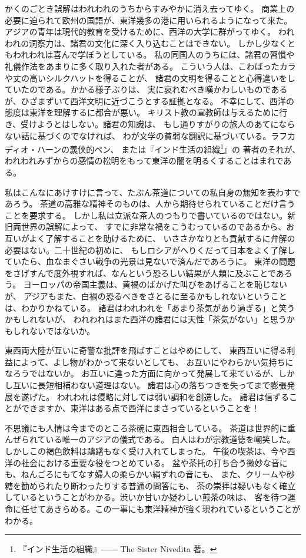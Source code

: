 \documentclass[a4paper, platex, dvipdfmx]{jsarticle}
\begin{document}
かくのごとき誤解はわれわれのうちからすみやかに消え去ってゆく。
商業上の必要に迫られて欧州の国語が、東洋幾多の港に用いられるようになって来た。
アジアの青年は現代的教育を受けるために、西洋の大学に群がってゆく。
われわれの洞察力は、諸君の文化に深く入り込むことはできない。
しかし少なくともわれわれは喜んで学ぼうとしている。
私の同国人のうちには、諸君の習慣や礼儀作法をあまりに多く取り入れた者がある。
こういう人は、こわばったカラや丈の高いシルクハットを得ることが、
諸君の文明を得ることと心得違いをしていたのである。かかる様子ぶりは、
実に哀れむべき嘆かわしいものであるが、ひざまずいて西洋文明に近づこうとする証拠となる。
不幸にして、西洋の態度は東洋を理解するに都合が悪い。
キリスト教の宣教師は与えるために行き、受けようとはしない。諸君の知識は、
もし通りすがりの旅人のあてにならない話に基づくのでなければ、
わが文学の貧弱な翻訳に基づいている。ラフカディオ・ハーンの義侠的ペン、
または『インド生活の組織\footnote{『インド生活の組織』―― The Sister Nivedita 著。}』の
著者のそれが、われわれみずからの感情の松明をもって東洋の闇を明るくすることはまれである。

私はこんなにあけすけに言って、たぶん茶道についての私自身の無知を表わすであろう。
茶道の高雅な精神そのものは、人から期待せられていることだけ言うことを要求する。
しかし私は立派な茶人のつもりで書いているのではない。新旧両世界の誤解によって、
すでに非常な禍をこうむっているのであるから、お互いがよく了解することを助けるために、
いささかなりとも貢献するに弁解の必要はない。二十世紀の初めに、
もしロシアがへりくだって日本をよく了解していたら、血なまぐさい戦争の光景は見ないで済んだであろうに。
東洋の問題をさげすんで度外視すれば、なんという恐ろしい結果が人類に及ぶことであろう。
ヨーロッパの帝国主義は、黄禍のばかげた叫びをあげることを恥じないが、
アジアもまた、白禍の恐るべきをさとるに至るかもしれないということは、わかりかねている。
諸君はわれわれを「あまり茶気があり過ぎる」と笑うかもしれないが、
われわれはまた西洋の諸君には天性「茶気がない」と思うかもしれないではないか。

東西両大陸が互いに奇警な批評を飛ばすことはやめにして、
東西互いに得る利益によって、よし物がわかって来ないとしても、
お互いにやわらかい気持ちになろうではないか。
お互いに違った方面に向かって発展して来ているが、しかし互いに長短相補わない道理はない。
諸君は心の落ちつきを失ってまで膨張発展を遂げた。
われわれは侵略に対しては弱い調和を創造した。
諸君は信ずることができますか、東洋はある点で西洋にまさっているということを！

不思議にも人情は今までのところ茶碗に東西相合している。
茶道は世界的に重んぜられている唯一のアジアの儀式である。
白人はわが宗教道徳を嘲笑した。しかしこの褐色飲料は躊躇もなく受け入れてしまった。
午後の喫茶は、今や西洋の社会における重要な役をつとめている。
盆や茶托の打ち合う微妙な音にも、ねんごろにもてなす婦人の柔らかい絹ずれの音にも、
また、クリームや砂糖を勧められたり断わったりする普通の問答にも、
茶の崇拝は疑いもなく確立しているということがわかる。渋いか甘いか疑わしい煎茶の味は、
客を待つ運命に任せてあきらめる。この一事にも東洋精神が強く現われているということがわかる。
\end{document}
